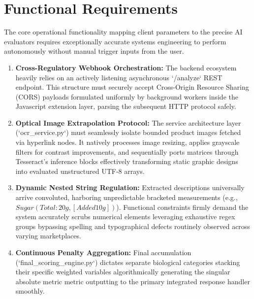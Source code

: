 \documentclass[12pt,a4paper]{report}
\begin{document}
\section{Functional Requirements}
The core operational functionality mapping client parameters to the precise AI evaluators requires exceptionally accurate systems engineering to perform autonomously without manual trigger inputs from the user.
\begin{enumerate}
    \item \textbf{Cross-Regulatory Webhook Orchestration:} The backend ecosystem heavily relies on an actively listening asynchronous `/analyze` REST endpoint. This structure must securely accept Cross-Origin Resource Sharing (CORS) payloads formulated uniformly by background workers inside the Javascript extension layer, parsing the subsequent HTTP protocol safely.
    \item \textbf{Optical Image Extrapolation Protocol:} The service architecture layer (`ocr\_service.py`) must seamlessly isolate bounded product images fetched via hyperlink nodes. It natively processes image resizing, applies grayscale filters for contrast improvements, and sequentially ports matrices through Tesseract's inference blocks effectively transforming static graphic designs into evaluated unstructured UTF-8 arrays.
    \item \textbf{Dynamic Nested String Regulation:} Extracted descriptions universally arrive convoluted, harboring unpredictable bracketed measurements (e.g., $Sugar(Total:20g,[Added 10g])$). Functional constraints firmly demand the system accurately scrubs numerical elements leveraging exhaustive regex groups bypassing spelling and typographical defects routinely observed across varying marketplaces.
    \item \textbf{Continuous Penalty Aggregation:} Final accumulation (`final\_scoring\_engine.py`) dictates separate biological categories stacking their specific weighted variables algorithmically generating the singular absolute metric metric outputting to the primary integrated response handler smoothly.
\end{enumerate}
\end{document}
